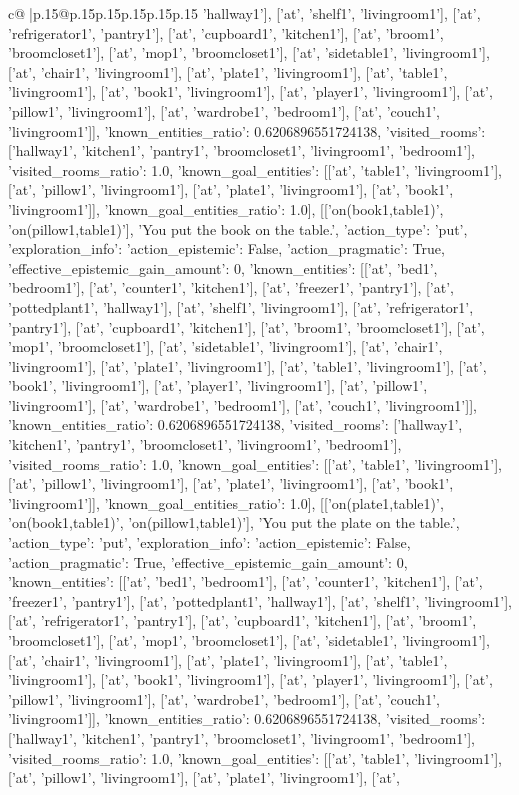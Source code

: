 \documentclass{article}
\begin{document}
{\begin{supertabular}{c@{$\;$}|p{.15\linewidth}@{}p{.15\linewidth}p{.15\linewidth}p{.15\linewidth}p{.15\linewidth}p{.15\linewidth}}
{{{'hallway1'], ['at', 'shelf1', 'livingroom1'], ['at', 'refrigerator1', 'pantry1'], ['at', 'cupboard1', 'kitchen1'], ['at', 'broom1', 'broomcloset1'], ['at', 'mop1', 'broomcloset1'], ['at', 'sidetable1', 'livingroom1'], ['at', 'chair1', 'livingroom1'], ['at', 'plate1', 'livingroom1'], ['at', 'table1', 'livingroom1'], ['at', 'book1', 'livingroom1'], ['at', 'player1', 'livingroom1'], ['at', 'pillow1', 'livingroom1'], ['at', 'wardrobe1', 'bedroom1'], ['at', 'couch1', 'livingroom1']], 'known_entities_ratio': 0.6206896551724138, 'visited_rooms': ['hallway1', 'kitchen1', 'pantry1', 'broomcloset1', 'livingroom1', 'bedroom1'], 'visited_rooms_ratio': 1.0, 'known_goal_entities': [['at', 'table1', 'livingroom1'], ['at', 'pillow1', 'livingroom1'], ['at', 'plate1', 'livingroom1'], ['at', 'book1', 'livingroom1']], 'known_goal_entities_ratio': 1.0}}], [['on(book1,table1)', 'on(pillow1,table1)'], 'You put the book on the table.', {'action_type': 'put', 'exploration_info': {'action_epistemic': False, 'action_pragmatic': True, 'effective_epistemic_gain_amount': 0, 'known_entities': [['at', 'bed1', 'bedroom1'], ['at', 'counter1', 'kitchen1'], ['at', 'freezer1', 'pantry1'], ['at', 'pottedplant1', 'hallway1'], ['at', 'shelf1', 'livingroom1'], ['at', 'refrigerator1', 'pantry1'], ['at', 'cupboard1', 'kitchen1'], ['at', 'broom1', 'broomcloset1'], ['at', 'mop1', 'broomcloset1'], ['at', 'sidetable1', 'livingroom1'], ['at', 'chair1', 'livingroom1'], ['at', 'plate1', 'livingroom1'], ['at', 'table1', 'livingroom1'], ['at', 'book1', 'livingroom1'], ['at', 'player1', 'livingroom1'], ['at', 'pillow1', 'livingroom1'], ['at', 'wardrobe1', 'bedroom1'], ['at', 'couch1', 'livingroom1']], 'known_entities_ratio': 0.6206896551724138, 'visited_rooms': ['hallway1', 'kitchen1', 'pantry1', 'broomcloset1', 'livingroom1', 'bedroom1'], 'visited_rooms_ratio': 1.0, 'known_goal_entities': [['at', 'table1', 'livingroom1'], ['at', 'pillow1', 'livingroom1'], ['at', 'plate1', 'livingroom1'], ['at', 'book1', 'livingroom1']], 'known_goal_entities_ratio': 1.0}}], [['on(plate1,table1)', 'on(book1,table1)', 'on(pillow1,table1)'], 'You put the plate on the table.', {'action_type': 'put', 'exploration_info': {'action_epistemic': False, 'action_pragmatic': True, 'effective_epistemic_gain_amount': 0, 'known_entities': [['at', 'bed1', 'bedroom1'], ['at', 'counter1', 'kitchen1'], ['at', 'freezer1', 'pantry1'], ['at', 'pottedplant1', 'hallway1'], ['at', 'shelf1', 'livingroom1'], ['at', 'refrigerator1', 'pantry1'], ['at', 'cupboard1', 'kitchen1'], ['at', 'broom1', 'broomcloset1'], ['at', 'mop1', 'broomcloset1'], ['at', 'sidetable1', 'livingroom1'], ['at', 'chair1', 'livingroom1'], ['at', 'plate1', 'livingroom1'], ['at', 'table1', 'livingroom1'], ['at', 'book1', 'livingroom1'], ['at', 'player1', 'livingroom1'], ['at', 'pillow1', 'livingroom1'], ['at', 'wardrobe1', 'bedroom1'], ['at', 'couch1', 'livingroom1']], 'known_entities_ratio': 0.6206896551724138, 'visited_rooms': ['hallway1', 'kitchen1', 'pantry1', 'broomcloset1', 'livingroom1', 'bedroom1'], 'visited_rooms_ratio': 1.0, 'known_goal_entities': [['at', 'table1', 'livingroom1'], ['at', 'pillow1', 'livingroom1'], ['at', 'plate1', 'livingroom1'], ['at', }}}
\end{supertabular}}
\end{document}
